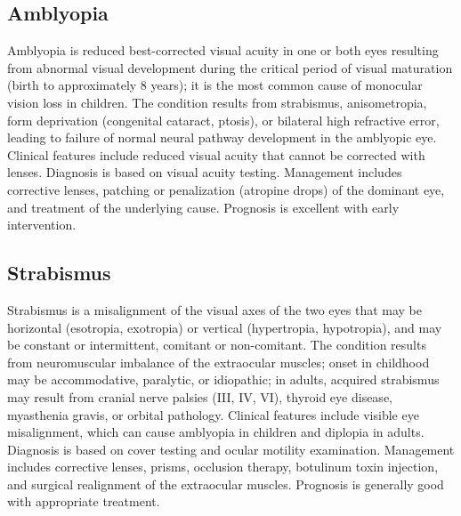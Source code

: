 \subsection{Amblyopia}
\label{sec:Amblyopia}
Amblyopia is reduced best-corrected visual acuity in one or both eyes resulting from abnormal visual development during the critical period of visual maturation (birth to approximately 8 years); it is the most common cause of monocular vision loss in children. The condition results from strabismus, anisometropia, form deprivation (congenital cataract, ptosis), or bilateral high refractive error, leading to failure of normal neural pathway development in the amblyopic eye. Clinical features include reduced visual acuity that cannot be corrected with lenses. Diagnosis is based on visual acuity testing. Management includes corrective lenses, patching or penalization (atropine drops) of the dominant eye, and treatment of the underlying cause. Prognosis is excellent with early intervention.

\subsection{Strabismus}
\label{sec:Strabismus}
Strabismus is a misalignment of the visual axes of the two eyes that may be horizontal (esotropia, exotropia) or vertical (hypertropia, hypotropia), and may be constant or intermittent, comitant or non-comitant. The condition results from neuromuscular imbalance of the extraocular muscles; onset in childhood may be accommodative, paralytic, or idiopathic; in adults, acquired strabismus may result from cranial nerve palsies (III, IV, VI), thyroid eye disease, myasthenia gravis, or orbital pathology. Clinical features include visible eye misalignment, which can cause amblyopia in children and diplopia in adults. Diagnosis is based on cover testing and ocular motility examination. Management includes corrective lenses, prisms, occlusion therapy, botulinum toxin injection, and surgical realignment of the extraocular muscles. Prognosis is generally good with appropriate treatment.

